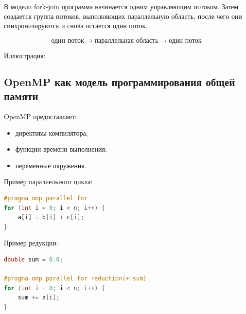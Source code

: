 \documentclass[12pt,a4paper]{article}
\begin{document}
В модели fork-join программа начинается одним управляющим потоком. Затем создается группа потоков, выполняющих параллельную область, после чего они синхронизируются и снова остается один поток.

\[
\text{один поток} \rightarrow
\text{параллельная область} \rightarrow
\text{один поток}
\]

Иллюстрация:

\begin{center}
\end{center}

\subsection{OpenMP как модель программирования общей памяти}

OpenMP предоставляет:
\begin{itemize}
    \item директивы компилятора;
    \item функции времени выполнения;
    \item переменные окружения.
\end{itemize}

Пример параллельного цикла:

\begin{lstlisting}[language=C]
#pragma omp parallel for
for (int i = 0; i < n; i++) {
    a[i] = b[i] + c[i];
}
\end{lstlisting}

Пример редукции:

\begin{lstlisting}[language=C]
double sum = 0.0;

#pragma omp parallel for reduction(+:sum)
for (int i = 0; i < n; i++) {
    sum += a[i];
}
\end{lstlisting}
\end{document}
